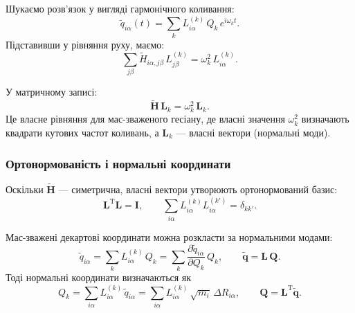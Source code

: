 Шукаємо розв’язок у вигляді гармонічного коливання:
\begin{equation*}
    \tilde{q}_{i\alpha}(t)
    = \sum_k L_{i\alpha}^{(k)}\, Q_k\, e^{i\omega_k t}.
\end{equation*}
Підставивши у рівняння руху, маємо:
\begin{equation}\label{eq:eigen-tilde-H-index}
    \sum_{j\beta}
        \tilde{H}_{i\alpha, j\beta}\,
        L_{j\beta}^{(k)}
    = \omega_k^2\, L_{i\alpha}^{(k)}.
\end{equation}

У матричному записі:
\begin{equation}\label{eq:eigen-tilde-H-matrix}
    \mathbf{\tilde{H}}\, \mathbf{L}_k
    = \omega_k^2\, \mathbf{L}_k.
\end{equation}
Це власне рівняння для мас-зваженого гесіану, де
власні значення $\omega_k^2$ визначають квадрати кутових частот коливань,
а $\mathbf{L}_k$ --- власні вектори (нормальні моди).

\subsubsection{Ортонормованість і нормальні координати}

Оскільки $\mathbf{\tilde{H}}$ --- симетрична,
власні вектори утворюють ортонормований базис:
\begin{equation*}
    \mathbf{L}^\mathrm{T}\mathbf{L} = \mathbf{I},
    \qquad
    \sum_{i\alpha} L_{i\alpha}^{(k)} L_{i\alpha}^{(k')} = \delta_{kk'}.
\end{equation*}

Мас-зважені декартові координати можна розкласти за нормальними модами:
\begin{equation}\label{eq:mass-wighted_q}
    \tilde{q}_{i\alpha} = \sum_k L_{i\alpha}^{(k)}\, Q_k = \sum_k \frac{\partial \tilde q_{i\alpha}}{\partial Q_k} \, Q_k,
    \qquad
    \mathbf{\tilde{q}} = \mathbf{L}\, \mathbf{Q}.
\end{equation}
Тоді нормальні координати визначаються як
\begin{equation*}
    Q_k = \sum_{i\alpha}
        L_{i\alpha}^{(k)}\, \tilde{q}_{i\alpha}
        = \sum_{i\alpha}
        L_{i\alpha}^{(k)}\, \sqrt{m_i}\, \Delta R_{i\alpha},
    \qquad
    \mathbf{Q} = \mathbf{L}^\mathrm{T}\mathbf{\tilde{q}}.
\end{equation*}


